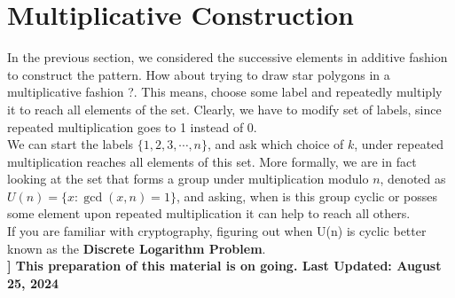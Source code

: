 \documentclass{article}
\begin{document}
\section{Multiplicative Construction}
In the previous section, we considered the successive elements in additive fashion to construct the pattern. How about trying to draw star polygons in a multiplicative fashion ?. This means, choose some label and repeatedly multiply it to reach all elements of the set. Clearly, we have to modify set of labels, since repeated multiplication goes to 1 instead of 0.\\[2mm]
We can start the labels $\{1,2,3,\cdots,n\}$, and ask which choice of $k$, under repeated multiplication reaches all elements of this set. More formally, we are in fact looking at the set that forms a group under multiplication modulo $n$, denoted as $U(n) = \{x: \gcd(x,n) =1\}$, and asking, when is this group cyclic or posses some element upon repeated multiplication it can help to reach all others.\\[2mm]
If you are familiar with cryptography, figuring out when U(n) is cyclic better known as the \textbf{ Discrete Logarithm Problem}. \\[4mm]
\textbf{]  This preparation of this material is on going. Last Updated: August 25, 2024}
\end{document}
